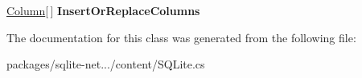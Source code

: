 \begin{DoxyCompactItemize}
\item 
\hypertarget{classSQLite_1_1TableMapping_ac88c964d9ed3ad2c6827ccfbe8765187}{}\hyperlink{classSQLite_1_1TableMapping_1_1Column}{Column}\mbox{[}$\,$\mbox{]} {\bfseries Insert\+Or\+Replace\+Columns}\label{classSQLite_1_1TableMapping_ac88c964d9ed3ad2c6827ccfbe8765187}

\end{DoxyCompactItemize}


The documentation for this class was generated from the following file\+:\begin{DoxyCompactItemize}
\item 
packages/sqlite-\/net.../content/S\+Q\+Lite.\+cs\end{DoxyCompactItemize}

